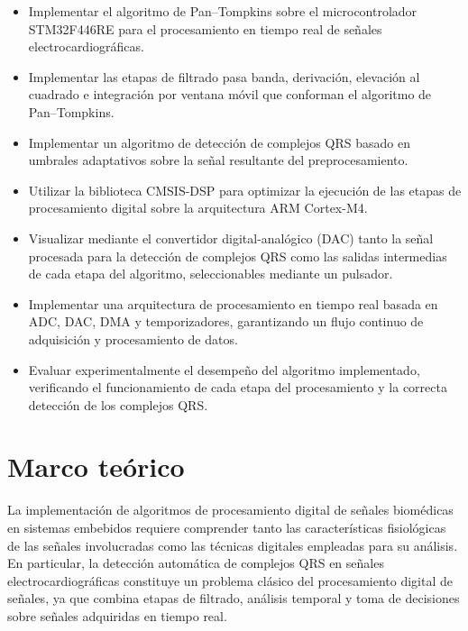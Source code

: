 \documentclass[12pt]{article}
\begin{document}
			\begin{itemize}

			\item Implementar el algoritmo de Pan--Tompkins sobre el microcontrolador STM32F446RE para el procesamiento en tiempo real de señales electrocardiográficas.

			\item Implementar las etapas de filtrado pasa banda, derivación, elevación al cuadrado e integración por ventana móvil que conforman el algoritmo de Pan--Tompkins.

			\item Implementar un algoritmo de detección de complejos QRS basado en umbrales adaptativos sobre la señal resultante del preprocesamiento.

			\item Utilizar la biblioteca CMSIS-DSP para optimizar la ejecución de las etapas de procesamiento digital sobre la arquitectura ARM Cortex-M4.

			\item Visualizar mediante el convertidor digital-analógico (DAC) tanto la señal procesada para la detección de complejos QRS como las salidas intermedias de cada etapa del algoritmo, seleccionables mediante un pulsador.

			\item Implementar una arquitectura de procesamiento en tiempo real basada en ADC, DAC, DMA y temporizadores, garantizando un flujo continuo de adquisición y procesamiento de datos.

			\item Evaluar experimentalmente el desempeño del algoritmo implementado, verificando el funcionamiento de cada etapa del procesamiento y la correcta detección de los complejos QRS.

			\end{itemize}
			
	\section{Marco teórico}

		La implementación de algoritmos de procesamiento digital de señales biomédicas en sistemas embebidos requiere comprender tanto las características fisiológicas de las señales involucradas como las técnicas digitales empleadas para su análisis. En particular, la detección automática de complejos QRS en señales electrocardiográficas constituye un problema clásico del procesamiento digital de señales, ya que combina etapas de filtrado, análisis temporal y toma de decisiones sobre señales adquiridas en tiempo real.
\end{document}
